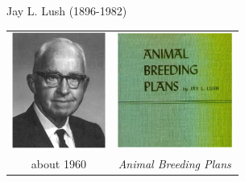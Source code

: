 \documentclass[pdf,bluish,slideColor,colorBG]{prosper}
\begin{document}
{\begin{slide}[Replace]{Jay L. Lush (1896-1982) }
\begin{center}
\begin{tabular}{c c}
\includegraphics[height=1.5in]{Lush.ps} &
\includegraphics[height=1.5in]{Lush1945.ps}\\
about 1960 & {\it Animal Breeding Plans}
\end{tabular}
\end{center}

\bigskip


\end{slide}

}
\end{document}
